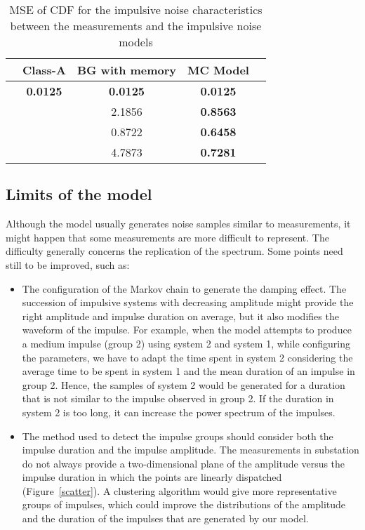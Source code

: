 \documentclass[journal]{IEEEtran}
\begin{document}
\begin{table}
  \centering
  \begin{tabular}{|c|c|c|c|c|}
   \hline
\centering{} & Class-A & BG with memory & MC Model \\\hline
    \centering{Samples value} & \textbf{0.0125} & \textbf{0.0125} & \textbf{0.0125} \\\hline
    \centering{Impulse duration} & \centering{}  & 2.1856 & \textbf{0.8563} \\\hline
    \centering{IAT} & \centering{}  & 0.8722 & \textbf{0.6458} \\\hline
    \centering{Impulse amplitude} & \centering{}  & 4.7873 & \textbf{0.7281} \\
    \hline
  \end{tabular}
  \caption{MSE of CDF for the impulsive noise characteristics between the measurements and the impulsive noise models}\label{MSE}
\end{table}

\subsection{Limits of the model}
Although the model usually generates noise samples similar to measurements, it might happen that some measurements are more difficult to represent. The difficulty generally concerns the replication of the spectrum. Some points need still to be improved, such as:\
\begin{itemize}
  \item The configuration of the Markov chain to generate the damping effect. The succession of impulsive systems with decreasing amplitude might provide the right amplitude and impulse duration on average, but it also modifies the waveform of the impulse. For example, when the model attempts to produce a medium impulse (group 2) using system 2 and system 1, while configuring the parameters, we have to adapt the time spent in system 2 considering the average time to be spent in system 1 and the mean duration of an impulse in group 2. Hence, the samples of system 2 would be generated for a duration that is not similar to the impulse observed in group 2. If the duration in system 2 is too long, it can increase the power spectrum of the impulses.
  \item The method used to detect the impulse groups should consider both the impulse duration and the impulse amplitude. The measurements in substation do not always provide a two-dimensional plane of the amplitude versus the impulse duration in which the points are linearly dispatched (Figure~\ref{scatter}). A clustering algorithm would give more representative groups of impulses, which could improve the distributions of the amplitude and the duration of the impulses that are generated by our model.
\end{itemize}
\end{document}
